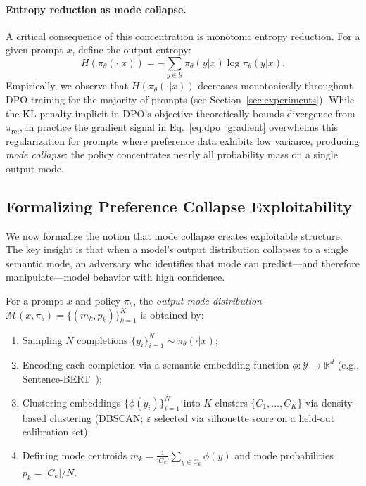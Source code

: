 \paragraph{Entropy reduction as mode collapse.} A critical consequence of this concentration is monotonic entropy reduction. For a given prompt $x$, define the output entropy:
\begin{equation}
H(\pi_\theta(\cdot|x)) = -\sum_{y \in \mathcal{Y}} \pi_\theta(y|x) \log \pi_\theta(y|x).
\end{equation}
Empirically, we observe that $H(\pi_\theta(\cdot|x))$ decreases monotonically throughout DPO training for the majority of prompts (see Section~\ref{sec:experiments}). While the KL penalty implicit in DPO's objective theoretically bounds divergence from $\pi_{\text{ref}}$, in practice the gradient signal in Eq.~\eqref{eq:dpo_gradient} overwhelms this regularization for prompts where preference data exhibits low variance, producing \emph{mode collapse}: the policy concentrates nearly all probability mass on a single output mode.

\subsection{Formalizing Preference Collapse Exploitability}
\label{sec:pce}

We now formalize the notion that mode collapse creates exploitable structure. The key insight is that when a model's output distribution collapses to a single semantic mode, an adversary who identifies that mode can predict---and therefore manipulate---model behavior with high confidence.

\begin{definition}
\label{def:mode_dist}
For a prompt $x$ and policy $\pi_\theta$, the \emph{output mode distribution} $\mathcal{M}(x, \pi_\theta) = \{(m_k, p_k)\}_{k=1}^K$ is obtained by:
\begin{enumerate}[leftmargin=*,itemsep=0pt]
    \item Sampling $N$ completions $\{y_i\}_{i=1}^N \sim \pi_\theta(\cdot|x)$;
    \item Encoding each completion via a semantic embedding function $\phi: \mathcal{Y} \to \mathbb{R}^d$ (e.g., Sentence-BERT~\citep{reimers2019sentence});
    \item Clustering embeddings $\{\phi(y_i)\}_{i=1}^N$ into $K$ clusters $\{C_1, \ldots, C_K\}$ via density-based clustering (DBSCAN; $\varepsilon$ selected via silhouette score on a held-out calibration set);
    \item Defining mode centroids $m_k = \frac{1}{|C_k|}\sum_{y \in C_k} \phi(y)$ and mode probabilities $p_k = |C_k|/N$.
\end{enumerate}
\end{definition}

